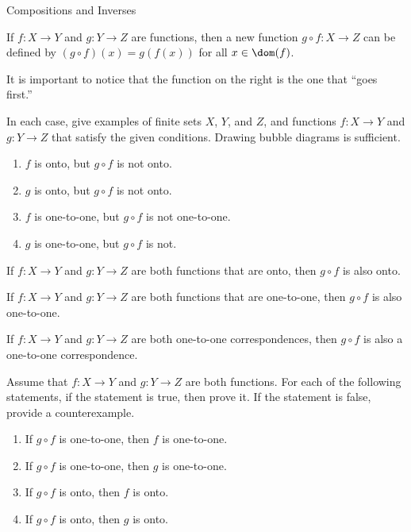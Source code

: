 \begin{section}{Compositions and Inverses}

\begin{definition}
If $f:X\to Y$ and $g:Y\to Z$ are functions, then a new function $g\circ f:X\to Z$ can be defined by $(g\circ f)(x)=g(f(x))$ for all $x\in\dom(f)$.
\end{definition}

\begin{remark}
It is important to notice that the function on the right is the one that ``goes first.''
\end{remark}

\begin{exercise}
In each case, give examples of finite sets $X$, $Y$, and $Z$, and functions $f:X\to Y$ and $g:Y\to Z$ that satisfy the given conditions.  Drawing bubble diagrams is sufficient.
\begin{enumerate}
\item $f$ is onto, but $g\circ f$ is not onto.
\item $g$ is onto, but $g\circ f$ is not onto.
\item $f$ is one-to-one, but $g\circ f$ is not one-to-one.
\item $g$ is one-to-one, but $g\circ f$ is not.
\end{enumerate}
\end{exercise}

\begin{theorem}
If $f:X\to Y$ and $g:Y\to Z$ are both functions that are onto, then $g\circ f$ is also onto.
\end{theorem}

\begin{theorem}
If $f:X\to Y$ and $g:Y\to Z$ are both functions that are one-to-one, then $g\circ f$ is also one-to-one.
\end{theorem}

\begin{corollary}
If $f:X\to Y$ and $g:Y\to Z$ are both one-to-one correspondences, then $g\circ f$ is also a one-to-one correspondence.
\end{corollary}

\begin{problem}
Assume that $f:X\to Y$ and $g:Y\to Z$ are both functions.  For each of the following statements, if the statement is true, then prove it.  If the statement is false, provide a counterexample.
\begin{enumerate}
\item If $g\circ f$ is one-to-one, then $f$ is one-to-one.
\item If $g\circ f$ is one-to-one, then $g$ is one-to-one.
\item If $g\circ f$ is onto, then $f$ is onto.
\item If $g\circ f$ is onto, then $g$ is onto.
\end{enumerate}
\end{problem}


\end{section}
